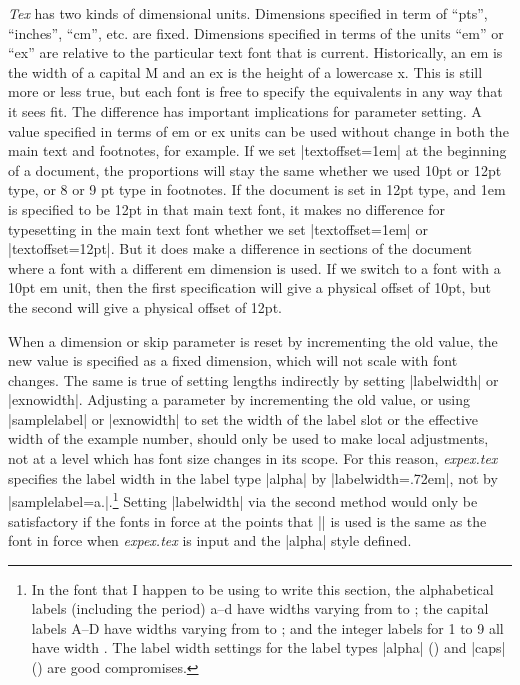 {\it Tex\/} has two kinds of dimensional units.  Dimensions
specified in term of ``pts'', ``inches'', ``cm'', etc. are fixed.
Dimensions specified in terms of the units ``em'' or ``ex'' are
relative to the particular text font that is current.
Historically, an em is the width of a capital M and an ex is the
height of a lowercase x.  This is still more or less true, but
each font is free to specify the equivalents in any way that it
sees fit.  The difference has important implications for
parameter setting.  A value specified in terms of em or ex units
can be used without change in both the main text and footnotes,
for example.  If we set |textoffset=1em| at the beginning of a
document, the proportions will stay the same whether we used 10pt
or 12pt type, or 8 or 9 pt type in footnotes.
If the document is set in 12pt type, and 1em is specified to be
12pt in that main text font, it makes no difference for
typesetting in the main text font whether we set |textoffset=1em|
or |textoffset=12pt|.  But it does make a difference in sections
of the document where a font with a different em dimension is
used.  If we switch to a font with a 10pt em unit, then the first
specification will give a physical offset of 10pt, but the second
will give a physical offset of 12pt.

When a dimension or skip parameter is reset by incrementing the old
value, the new value is specified as a fixed dimension, which will
not scale with font changes.  The same is true of setting lengths
indirectly by setting |labelwidth| or |exnowidth|.  Adjusting a
parameter by incrementing the old value, or using |samplelabel|
or |exnowidth| to set the width of the label slot or the
effective width of the example number, should only be used to
make local adjustments, not at a level which has font size
changes in its scope.  For this reason, {\sl expex.tex\/}
specifies the label width in the label type |alpha| by
|labelwidth=.72em|, not by |samplelabel=a.|.\footnote{%
In the font
that I happen to be using to write this section, the alphabetical
labels (including the period) a--d have widths varying from
\textdim{.694 em} to \textdim{.75 em}; the capital labels A--D
have widths varying from \textdim{.917 em} to \textdim{.972 em};
and the integer labels for 1 to 9 all have width \textdim{.75
em}. The label width settings for the label types |alpha|
(\textdim{.72 em}) and |caps| (\textdim{.94 em}) are good
compromises.}
Setting |labelwidth| via the second method would only be
satisfactory if the fonts in force at the points that |\pex| is
used is the same as the font in force when {\sl expex.tex\/} is
input and the |alpha| style defined.

